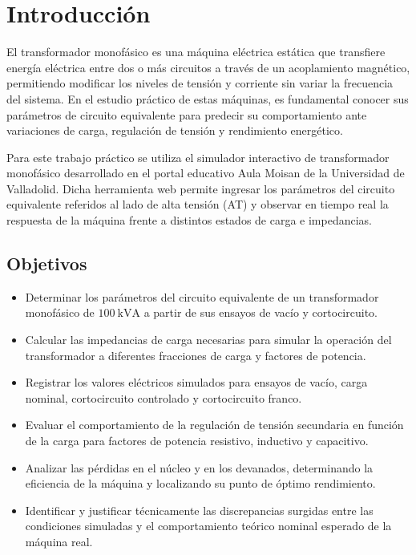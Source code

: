 \chapter{Introducción}

El transformador monofásico es una máquina eléctrica estática que transfiere energía eléctrica entre dos o más
circuitos a través de un acoplamiento magnético, permitiendo modificar los niveles de tensión y corriente sin variar la
frecuencia del sistema. En el estudio práctico de estas máquinas, es fundamental conocer sus parámetros de circuito
equivalente para predecir su comportamiento ante variaciones de carga, regulación de tensión y rendimiento energético.

Para este trabajo práctico se utiliza el simulador interactivo de transformador monofásico desarrollado en el portal
educativo Aula Moisan de la Universidad de Valladolid. Dicha herramienta web permite ingresar los parámetros del circuito
equivalente referidos al lado de alta tensión (AT) y observar en tiempo real la respuesta de la máquina frente a
distintos estados de carga e impedancias.

\section{Objetivos}
\begin{itemize}
    \item Determinar los parámetros del circuito equivalente de un transformador monofásico de $\SI{100}{\kilo\volt\ampere}$
    a partir de sus ensayos de vacío y cortocircuito.
    \item Calcular las impedancias de carga necesarias para simular la operación del transformador a diferentes fracciones
    de carga y factores de potencia.
    \item Registrar los valores eléctricos simulados para ensayos de vacío, carga nominal, cortocircuito controlado y
    cortocircuito franco.
    \item Evaluar el comportamiento de la regulación de tensión secundaria en función de la carga para factores de potencia
    resistivo, inductivo y capacitivo.
    \item Analizar las pérdidas en el núcleo y en los devanados, determinando la eficiencia de la máquina y localizando su
    punto de óptimo rendimiento.
    \item Identificar y justificar técnicamente las discrepancias surgidas entre las condiciones simuladas y el
    comportamiento teórico nominal esperado de la máquina real.
\end{itemize}
